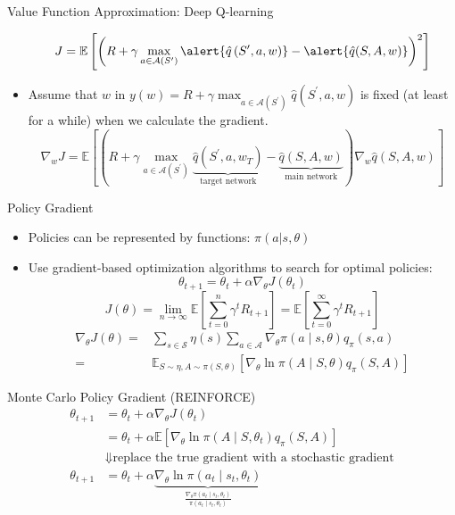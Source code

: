 \documentclass[UTF8, 10pt]{beamer}
\begin{document}
\begin{CJK*}{UTF8}{gbsn}
\begin{frame}{Value Function Approximation: Deep Q-learning}
\begin{itemize}
			$$
			J=\mathbb{E}\left[\left(R+\gamma \max _{a \in \mathcal{A}\left(S^{\prime}\right)} \alert{\hat{q}\left(S^{\prime}, a, w\right)}-\alert{\hat{q}(S, A, w)}\right)^{2}\right]
			$$
		\item Assume that $w$ in $y(w)=R+\gamma \max _{a \in \mathcal{A}\left(S^{\prime}\right)} \hat{q}\left(S^{\prime}, a, w\right)$ is fixed (at least for a while) when we calculate the gradient.
				$$
				\nabla_{w} J=\mathbb{E}\left[\left(R+\gamma \max _{a \in \mathcal{A}\left(S^{\prime}\right)} \underbrace{\hat{q}\left(S^{\prime}, a, w_{T}\right)}_{\text{target network}}-\underbrace{\hat{q}(S, A, w)}_{\text{main network}}\right) \nabla_{w} \hat{q}(S, A, w)\right]
				$$
	\end{itemize}
\end{frame}
\begin{frame}{Policy Gradient}
	\begin{itemize}
		\item Policies can be represented by functions: $\pi(a|s,\theta)$
		\item Use gradient-based optimization algorithms to search for optimal policies:
			$$
			\theta_{t+1}=\theta_{t}+\alpha \nabla_{\theta} J\left(\theta_{t}\right)
			$$
			$$
			J(\theta)=\lim _{n \rightarrow \infty} \mathbb{E}\left[\sum_{t=0}^{n} \gamma^{t} R_{t+1}\right]=\mathbb{E}\left[\sum_{t=0}^{\infty} \gamma^{t} R_{t+1}\right]
			$$
			$$
			\begin{aligned}
			\nabla_{\theta} J(\theta)=&\sum_{s \in \mathcal{S}} \eta(s) \sum_{a \in \mathcal{A}} \nabla_{\theta} \pi(a \mid s, \theta) q_{\pi}(s, a)
			\\
			=&\mathbb{E}_{S \sim \eta, A \sim \pi(S, \theta)}\left[\nabla_{\theta} \ln \pi(A \mid S, \theta) q_{\pi}(S, A)\right]
			\end{aligned} 
			$$
	\end{itemize} 
\end{frame}
\begin{frame}{Monte Carlo Policy Gradient (REINFORCE)}
	$$
	\begin{aligned} \theta_{t+1} & =\theta_{t}+\alpha \nabla_{\theta} J\left(\theta_{t}\right) \\ & =\theta_{t}+\alpha \mathbb{E}\left[\nabla_{\theta} \ln \pi\left(A \mid S, \theta_{t}\right) q_{\pi}(S, A)\right]
	\\& \Downarrow \text{replace the true gradient with a stochastic gradient} \\ 
	\theta_{t+1}&=\theta_{t}+\alpha 
	\underbrace{\nabla_{\theta} \ln \pi\left(a_{t} \mid s_{t}, \theta_{t}\right)}_{\frac{\nabla_{\theta} \pi\left(a_{t} \mid s_{t}, \theta_{t}\right)}{\pi\left(a_{t} \mid s_{t}, \theta_{t}\right)}}

\end{aligned}$$
\end{frame}
\end{CJK*}
\end{document}
